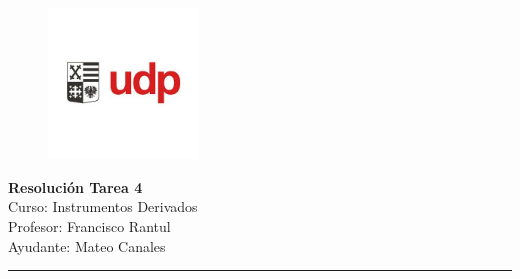 \documentclass[12pt]{article}
\begin{document}
\begin{figure}
    \vspace{-5em}    
    \flushright
    \includegraphics[height=4cm]{../imagenes/logo.png}\\[-3em]
\end{figure}
\begin{center}
    {\LARGE \textbf{Resolución Tarea 4}}\\[0.5em]
    Curso: Instrumentos Derivados\\
    Profesor: Francisco Rantul\\
    Ayudante: Mateo Canales\\
\end{center}
\vspace{1pt}
{\color{rojoudp}\hrule height 2pt}
\vspace{10pt}

\newcommand{\arbol}{$p = \frac{e^{r\cdot \Delta t}-d}{u-d}$}
\newcommand{\neutral}{$f = e^{-r \cdot \Delta t}\cdot (p \cdot f_u+(1-p) \cdot f_d)$}
\newcommand{\putcall}{$S_0+p = K \cdot e^{-r \cdot T}+c$}
\newcommand{\ceroud}{$S_0u|d=S_0*(1+(subida|bajada)) $}
\newcommand{\neutrali}{$S_0d\cdot \Delta-f_d=S_0u\cdot \Delta-f_u$}
\newcommand{\portafolio}{$S_0\cdot \Delta-f=(S_0u\cdot \Delta-f_u) \cdot e^{-rT}$}
\newcommand{\calcud}{$u|d=\frac{S_0u|d}{S_0}$}
\newcommand{\callbsm}{$c =  S_0 \cdot \mathcal{N}(d_1)- K \cdot e^{-r \cdot (T)} \cdot \mathcal{N}(d_2) $}
\newcommand{\putbsm}{$p = K \cdot e^{-r \cdot (T)} \cdot \mathcal{N}(-d_2) - S_0 \cdot \mathcal{N}(-d_1)$}
\newcommand{\enemenosuno}{$\mathcal{N}(-d)=1-\mathcal{N}(d)$}
\newcommand{\Duno }{$  d_1 = \frac{\ln(S_0 / K) + \left( r + \frac{\sigma^2}{2} \right) \cdot T}{\sigma \cdot \sqrt{T}}$}
\newcommand{\Ddos}{$d_2 = d_1 - \sigma \cdot \sqrt{T}$}
\newcommand{\dividendo}{$S_1 = S_0 - e^{-r \cdot t} \cdot div $}
\newcommand{\vp}{$vp =e^{-r \cdot t} \cdot valor futuro $}
\newcommand{\browniano}{$\ln (S_T) \sim \mathcal{N}\left(\ln (S_0) + (\mu - \sigma^2/2)\cdot T,\ \sigma^2 \cdot T\right)$ }
\newcommand{\media}{$\mathbb{E}(S_T) = S_0 \cdot e^{\mu \cdot T}$}
\newcommand{\varianza}{$\mathrm{var}(S_T) = S_0^2 \cdot e^{2\cdot \mu \cdot T} \cdot \left( e^{\sigma^2\cdot T} - 1 \right)$}
\newcommand{\standarizar}{$Z = \frac{\ln K - \mathbb{E}[\ln S_T]}{\text{desv.\ estándar}}$}
\newcommand{\intervaloconf}{$IC = \left[ \mathbb{E}(S_T) - Z_{\alpha/2} \cdot \mathrm{sd}{S_T},\ \mathbb{E}(S_T) + Z_{\alpha/2} \cdot \mathrm{sd}(S_T)\right]$}
\newcommand{\ito}{\[df = \left( \frac{\partial f}{\partial t} + \mu \frac{\partial f}{\partial x} + \frac{1}{2} \sigma^2 \frac{\partial^2 f}{\partial x^2} \right) dt + \sigma \frac{\partial f}{\partial x} dz\]
}
\end{document}
